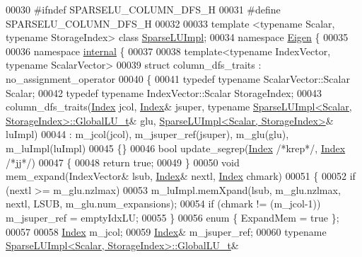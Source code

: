 \begin{DoxyCode}
00030 \textcolor{preprocessor}{#ifndef SPARSELU\_COLUMN\_DFS\_H}
00031 \textcolor{preprocessor}{#define SPARSELU\_COLUMN\_DFS\_H}
00032 
00033 \textcolor{keyword}{template} <\textcolor{keyword}{typename} Scalar, \textcolor{keyword}{typename} StorageIndex> \textcolor{keyword}{class }\hyperlink{class_sparse_l_u_impl}{SparseLUImpl};
00034 \textcolor{keyword}{namespace }\hyperlink{namespace_eigen}{Eigen} \{
00035 
00036 \textcolor{keyword}{namespace }\hyperlink{namespaceinternal}{internal} \{
00037 
00038 \textcolor{keyword}{template}<\textcolor{keyword}{typename} IndexVector, \textcolor{keyword}{typename} ScalarVector>
00039 \textcolor{keyword}{struct }column\_dfs\_traits : no\_assignment\_operator
00040 \{
00041   \textcolor{keyword}{typedef} \textcolor{keyword}{typename} ScalarVector::Scalar Scalar;
00042   \textcolor{keyword}{typedef} \textcolor{keyword}{typename} IndexVector::Scalar StorageIndex;
00043   column\_dfs\_traits(\hyperlink{namespace_eigen_a62e77e0933482dafde8fe197d9a2cfde}{Index} jcol, \hyperlink{namespace_eigen_a62e77e0933482dafde8fe197d9a2cfde}{Index}& jsuper, \textcolor{keyword}{typename} 
      \hyperlink{class_sparse_l_u_impl}{SparseLUImpl<Scalar, StorageIndex>::GlobalLU\_t}& glu, 
      \hyperlink{class_sparse_l_u_impl}{SparseLUImpl<Scalar, StorageIndex>}& luImpl)
00044    : m\_jcol(jcol), m\_jsuper\_ref(jsuper), m\_glu(glu), m\_luImpl(luImpl)
00045  \{\}
00046   \textcolor{keywordtype}{bool} update\_segrep(\hyperlink{namespace_eigen_a62e77e0933482dafde8fe197d9a2cfde}{Index} \textcolor{comment}{/*krep*/}, \hyperlink{namespace_eigen_a62e77e0933482dafde8fe197d9a2cfde}{Index} \textcolor{comment}{/*jj*/})
00047   \{
00048     \textcolor{keywordflow}{return} \textcolor{keyword}{true};
00049   \}
00050   \textcolor{keywordtype}{void} mem\_expand(IndexVector& lsub, \hyperlink{namespace_eigen_a62e77e0933482dafde8fe197d9a2cfde}{Index}& nextl, \hyperlink{namespace_eigen_a62e77e0933482dafde8fe197d9a2cfde}{Index} chmark)
00051   \{
00052     \textcolor{keywordflow}{if} (nextl >= m\_glu.nzlmax)
00053       m\_luImpl.memXpand(lsub, m\_glu.nzlmax, nextl, LSUB, m\_glu.num\_expansions); 
00054     \textcolor{keywordflow}{if} (chmark != (m\_jcol-1)) m\_jsuper\_ref = emptyIdxLU;
00055   \}
00056   \textcolor{keyword}{enum} \{ ExpandMem = \textcolor{keyword}{true} \};
00057   
00058   \hyperlink{namespace_eigen_a62e77e0933482dafde8fe197d9a2cfde}{Index} m\_jcol;
00059   \hyperlink{namespace_eigen_a62e77e0933482dafde8fe197d9a2cfde}{Index}& m\_jsuper\_ref;
00060   \textcolor{keyword}{typename} \hyperlink{class_sparse_l_u_impl}{SparseLUImpl<Scalar, StorageIndex>::GlobalLU\_t}& 

\end{DoxyCode}
